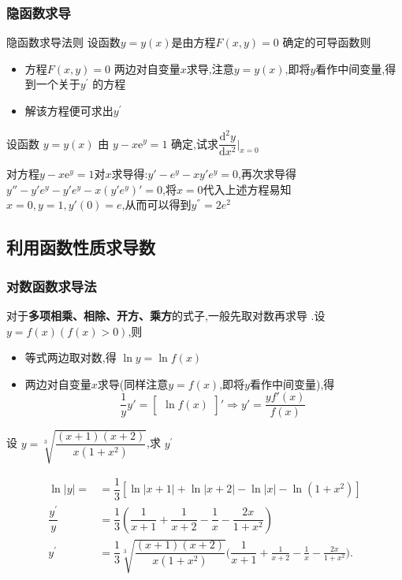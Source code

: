 \documentclass[8pt a4paper, oneside, UTF8]{ctexbook}  %
\begin{document}
\begin{sloppypar}
    \subsubsection{隐函数求导}
    \begin{defn}{隐函数求导法则}{}
        设函数$y=y(x)$是由方程$F(x,y)=0$ 确定的可导函数则
        \begin{itemize}
            \item 方程$F(x,y)=0$ 两边对自变量$x$求导,注意$y=y(x)$,即将$y$看作中间变量,得到一个关于$y^{\prime}$ 的方程
            \item 解该方程便可求出$y^{\prime}$
        \end{itemize}
    \end{defn}
    \begin{problem}
    设函数 $y=y(x)$ 由 $y-x\mathrm{e}^y=1$ 确定,试求$\dfrac{\mathrm{d}^2y}{\mathrm{d}x^2}\Bigg|_{x=0}$
    \end{problem}
    \begin{solution}
        对方程$y-x\mathrm{e}^y=1$对$x$求导得:$y' - e^y-xy'e^y=0$,再次求导得$y'' -y'e^y-y'e^{y}-x\left(y'e^{y}\right)'=0$,将$x=0$代入上述方程易知$x=0,y=1,y'(0)=e$,从而可以得到$y^{''}=2e^2$
    \end{solution}
    \subsection{利用函数性质求导数}
    \subsubsection{对数函数求导法}
    对于\textbf{多项相乘、相除、开方、乘方}的式子,一般先取对数再求导 .设$y=f(x)(f(x)>0)$,则
    \begin{itemize}
        \item 等式两边取对数,得 $\ln y=\ln f(x)$
        \item 两边对自变量$x$求导(同样注意$y=f(x)$,即将$y$看作中间变量),得
              $$
                  \dfrac{1}{y}y'=\begin{bmatrix}\ln f(x)\end{bmatrix}'\Rightarrow y'=\frac{yf'(x)}{f(x)}\
              $$
    \end{itemize}
    \begin{problem}
    设 $y=\sqrt[3]{\dfrac{\left(x+1\right)\left(x+2\right)}{x\left(1+x^{2}\right)}}$,求 $y^\prime$
    \end{problem}
    \begin{solution}
        \begin{align*}
            \ln |y|=              & = \dfrac{1}{3}[\ln| x+1 |+\ln| x+2 |-\ln| x |-\ln(1+x^{2})]                                                                 \\
            \dfrac{y^{\prime}}{y} & =\dfrac{1}{3}\left(\dfrac{1}{x+1}+\dfrac{1}{x+2}-\dfrac{1}{x}-\dfrac{2x}{1+x^{2}}\right)                                    \\
            y^{\prime}            & =\dfrac{1}{3}\sqrt[3]{\dfrac{(x+1)(x+2)}{x(1+x^{2})}}\Big(\dfrac{1}{x+1}+\frac{1}{x+2}-\frac{1}{x}-\frac{2x}{1+x^{2}}\Big).
        \end{align*}
    \end{solution}

\end{sloppypar}
\end{document}
